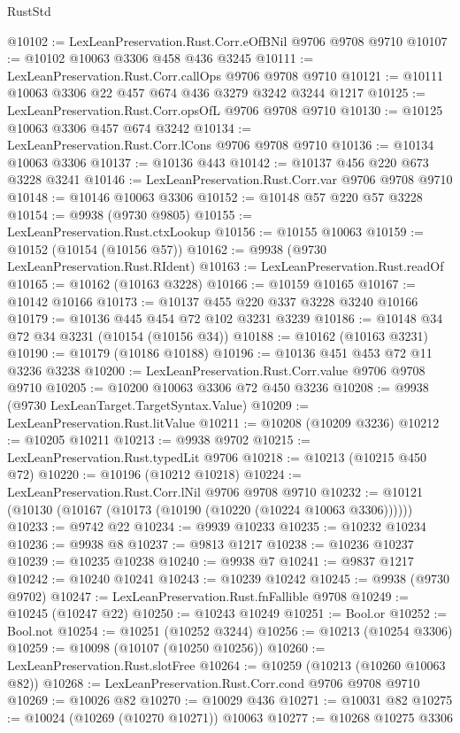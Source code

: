 \begin{lexlean}{RustStd}
\begin{coremodule}
{\begin{coremodule}
{{{{{{{{{{{{{{{{{{{{{{{{{{@10102 := LexLeanPreservation.Rust.Corr.eOfBNil @9706 @9708 @9710
@10107 := @10102 @10063 @3306 @458 @436 @3245
@10111 := LexLeanPreservation.Rust.Corr.callOps @9706 @9708 @9710
@10121 := @10111 @10063 @3306 @22 @457 @674 @436 @3279 @3242 @3244 @1217
@10125 := LexLeanPreservation.Rust.Corr.opsOfL @9706 @9708 @9710
@10130 := @10125 @10063 @3306 @457 @674 @3242
@10134 := LexLeanPreservation.Rust.Corr.lCons @9706 @9708 @9710
@10136 := @10134 @10063 @3306
@10137 := @10136 @443
@10142 := @10137 @456 @220 @673 @3228 @3241
@10146 := LexLeanPreservation.Rust.Corr.var @9706 @9708 @9710
@10148 := @10146 @10063 @3306
@10152 := @10148 @57 @220 @57 @3228
@10154 := @9938 (@9730 @9805)
@10155 := LexLeanPreservation.Rust.ctxLookup
@10156 := @10155 @10063
@10159 := @10152 (@10154 (@10156 @57))
@10162 := @9938 (@9730 LexLeanPreservation.Rust.RIdent)
@10163 := LexLeanPreservation.Rust.readOf
@10165 := @10162 (@10163 @3228)
@10166 := @10159 @10165
@10167 := @10142 @10166
@10173 := @10137 @455 @220 @337 @3228 @3240 @10166
@10179 := @10136 @445 @454 @72 @102 @3231 @3239
@10186 := @10148 @34 @72 @34 @3231 (@10154 (@10156 @34))
@10188 := @10162 (@10163 @3231)
@10190 := @10179 (@10186 @10188)
@10196 := @10136 @451 @453 @72 @11 @3236 @3238
@10200 := LexLeanPreservation.Rust.Corr.value @9706 @9708 @9710
@10205 := @10200 @10063 @3306 @72 @450 @3236
@10208 := @9938 (@9730 LexLeanTarget.TargetSyntax.Value)
@10209 := LexLeanPreservation.Rust.litValue
@10211 := @10208 (@10209 @3236)
@10212 := @10205 @10211
@10213 := @9938 @9702
@10215 := LexLeanPreservation.Rust.typedLit @9706
@10218 := @10213 (@10215 @450 @72)
@10220 := @10196 (@10212 @10218)
@10224 := LexLeanPreservation.Rust.Corr.lNil @9706 @9708 @9710
@10232 := @10121 (@10130 (@10167 (@10173 (@10190 (@10220 (@10224 @10063 @3306))))))
@10233 := @9742 @22
@10234 := @9939 @10233
@10235 := @10232 @10234
@10236 := @9938 @8
@10237 := @9813 @1217
@10238 := @10236 @10237
@10239 := @10235 @10238
@10240 := @9938 @7
@10241 := @9837 @1217
@10242 := @10240 @10241
@10243 := @10239 @10242
@10245 := @9938 (@9730 @9702)
@10247 := LexLeanPreservation.Rust.fnFallible @9708
@10249 := @10245 (@10247 @22)
@10250 := @10243 @10249
@10251 := Bool.or
@10252 := Bool.not
@10254 := @10251 (@10252 @3244)
@10256 := @10213 (@10254 @3306)
@10259 := @10098 (@10107 (@10250 @10256))
@10260 := LexLeanPreservation.Rust.slotFree
@10264 := @10259 (@10213 (@10260 @10063 @82))
@10268 := LexLeanPreservation.Rust.Corr.cond @9706 @9708 @9710
@10269 := @10026 @82
@10270 := @10029 @436
@10271 := @10031 @82
@10275 := @10024 (@10269 (@10270 @10271)) @10063
@10277 := @10268 @10275 @3306
}}}}}}}}}}}}}}}}}}}}}}}}}}
\end{coremodule}}
\end{coremodule}
\end{lexlean}
